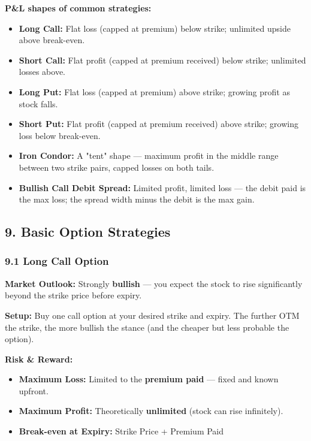 \documentclass[12pt,openany]{book}
\begin{document}
\textbf{P\&L shapes of common strategies:}
\begin{itemize}[leftmargin=*]
    \item \textbf{Long Call:} Flat loss (capped at premium) below strike; unlimited upside above break-even.
    \item \textbf{Short Call:} Flat profit (capped at premium received) below strike; unlimited losses above.
    \item \textbf{Long Put:} Flat loss (capped at premium) above strike; growing profit as stock falls.
    \item \textbf{Short Put:} Flat profit (capped at premium received) above strike; growing loss below break-even.
    \item \textbf{Iron Condor:} A "tent" shape — maximum profit in the middle range between two strike pairs, capped losses on both tails.
    \item \textbf{Bullish Call Debit Spread:} Limited profit, limited loss — the debit paid is the max loss; the spread width minus the debit is the max gain.
\end{itemize}

\subsection{9. Basic Option Strategies}

\subsubsection{9.1 Long Call Option}

\textbf{Market Outlook:} Strongly \textbf{bullish} — you expect the stock to rise significantly beyond the strike price before expiry.

\textbf{Setup:} Buy one call option at your desired strike and expiry. The further OTM the strike, the more bullish the stance (and the cheaper but less probable the option).

\textbf{Risk \& Reward:}
\begin{itemize}[leftmargin=*]
    \item \textbf{Maximum Loss:} Limited to the \textbf{premium paid} — fixed and known upfront.
    \item \textbf{Maximum Profit:} Theoretically \textbf{unlimited} (stock can rise infinitely).
    \item \textbf{Break-even at Expiry:} Strike Price + Premium Paid
\end{itemize}
\end{document}
